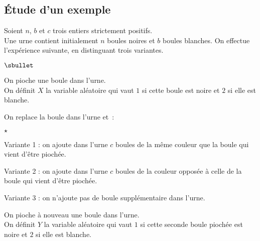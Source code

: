 \documentclass[11pt]{article}%
\begin{document}


\subsection*{\'Etude d'un exemple}

\noindent
Soient $n$, $b$ et $c$ trois entiers strictement positifs.\\
Une urne contient initialement $n$ boules noires et $b$ boules
blanches. On effectue l'expérience suivante, en distinguant trois
variantes.

\begin{noliste}{$\sbullet$}
\item On pioche une boule dans l'urne. \\
  On définit $X$ la variable aléatoire qui vaut $1$ si cette boule est
  noire et $2$ si elle est blanche.
  
\item On replace la boule dans l'urne et~:
  \begin{noliste}{$\star$}
  \item Variante 1 : on ajoute dans l'urne $c$ boules de la même 
    couleur que la boule qui vient d'être piochée.
    
  \item Variante 2 : on ajoute dans l'urne $c$ boules de la 
    couleur opposée à celle de la boule qui vient d'être piochée.
    
  \item Variante 3 : on n'ajoute pas de boule supplémentaire 
    dans l'urne.
  \end{noliste}
  
\item On pioche à nouveau une boule dans l'urne.\\
  On définit $Y$ la variable aléatoire qui vaut $1$ si cette seconde 
  boule piochée est noire et $2$ si elle est blanche.
\end{noliste}
\end{document}
